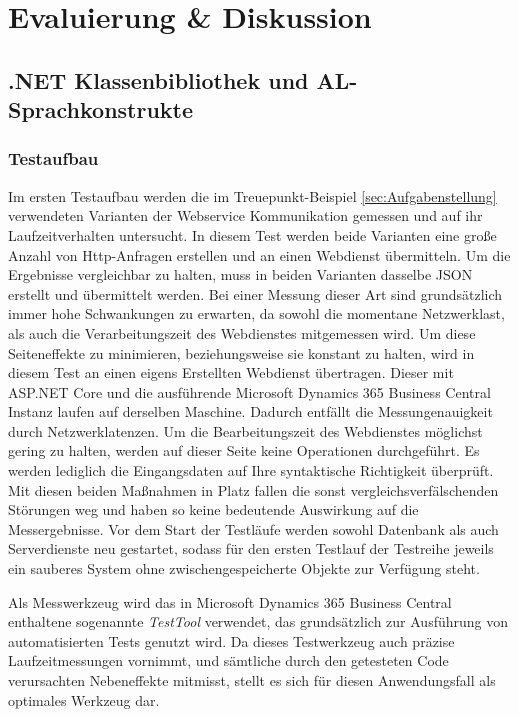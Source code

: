 \chapter{Evaluierung \& Diskussion}
\label{cha:Tests und Evaluierung}

\section{.NET Klassenbibliothek und AL-Sprachkonstrukte}
\subsection{Testaufbau}
Im ersten Testaufbau werden die im Treuepunkt-Beispiel \ref{sec:Aufgabenstellung} verwendeten Varianten der Webservice Kommunikation gemessen und auf ihr Laufzeitverhalten untersucht. In diesem Test werden beide Varianten eine große Anzahl von Http-Anfragen erstellen und an einen Webdienst übermitteln. Um die Ergebnisse vergleichbar zu halten, muss in beiden Varianten dasselbe JSON erstellt und übermittelt werden. Bei einer Messung dieser Art sind grundsätzlich immer hohe Schwankungen zu erwarten, da sowohl die momentane Netzwerklast, als auch die Verarbeitungszeit des Webdienstes mitgemessen wird. Um diese Seiteneffekte zu minimieren, beziehungsweise sie konstant zu halten, wird in diesem Test an einen eigens Erstellten Webdienst übertragen. Dieser mit ASP.NET Core und die ausführende Microsoft Dynamics 365 Business Central Instanz laufen auf derselben Maschine. Dadurch entfällt die Messungenauigkeit durch Netzwerklatenzen. Um die Bearbeitungszeit des Webdienstes möglichst gering zu halten, werden auf dieser Seite keine Operationen durchgeführt. Es werden lediglich die Eingangsdaten auf Ihre syntaktische Richtigkeit überprüft. Mit diesen beiden Maßnahmen in Platz fallen die sonst vergleichsverfälschenden Störungen weg und haben so keine bedeutende Auswirkung auf die Messergebnisse. Vor dem Start der Testläufe werden sowohl Datenbank als auch Serverdienste neu gestartet, sodass für den ersten Testlauf der Testreihe jeweils ein sauberes System ohne zwischengespeicherte Objekte zur Verfügung steht.

Als Messwerkzeug wird das in Microsoft Dynamics 365 Business Central enthaltene sogenannte \textit{TestTool} verwendet, das grundsätzlich zur Ausführung von automatisierten Tests genutzt wird. Da dieses Testwerkzeug auch präzise Laufzeitmessungen vornimmt, und sämtliche durch den getesteten Code verursachten Nebeneffekte mitmisst, stellt es sich für diesen Anwendungsfall als optimales Werkzeug dar.
\pagebreak

